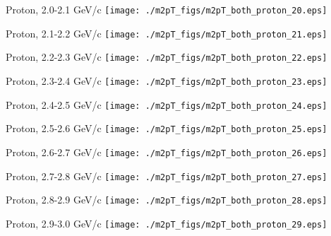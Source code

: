 \documentclass[compress]{beamer} %
\begin{document}
\begin{frame}{Proton, 2.0-2.1 GeV/c}
\texttt{[image: ./m2pT\_figs/m2pT\_both\_proton\_20.eps]}
\end{frame}
\begin{frame}{Proton, 2.1-2.2 GeV/c}
\texttt{[image: ./m2pT\_figs/m2pT\_both\_proton\_21.eps]}
\end{frame}
\begin{frame}{Proton, 2.2-2.3 GeV/c}
\texttt{[image: ./m2pT\_figs/m2pT\_both\_proton\_22.eps]}
\end{frame}
\begin{frame}{Proton, 2.3-2.4 GeV/c}
\texttt{[image: ./m2pT\_figs/m2pT\_both\_proton\_23.eps]}
\end{frame}
\begin{frame}{Proton, 2.4-2.5 GeV/c}
\texttt{[image: ./m2pT\_figs/m2pT\_both\_proton\_24.eps]}
\end{frame}
\begin{frame}{Proton, 2.5-2.6 GeV/c}
\texttt{[image: ./m2pT\_figs/m2pT\_both\_proton\_25.eps]}
\end{frame}
\begin{frame}{Proton, 2.6-2.7 GeV/c}
\texttt{[image: ./m2pT\_figs/m2pT\_both\_proton\_26.eps]}
\end{frame}
\begin{frame}{Proton, 2.7-2.8 GeV/c}
\texttt{[image: ./m2pT\_figs/m2pT\_both\_proton\_27.eps]}
\end{frame}
\begin{frame}{Proton, 2.8-2.9 GeV/c}
\texttt{[image: ./m2pT\_figs/m2pT\_both\_proton\_28.eps]}
\end{frame}
\begin{frame}{Proton, 2.9-3.0 GeV/c}
\texttt{[image: ./m2pT\_figs/m2pT\_both\_proton\_29.eps]}
\end{frame}
\end{document}
